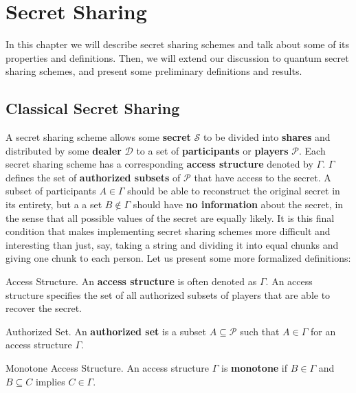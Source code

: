 \chapter{Secret Sharing}
\label{ch:ss}

In this chapter we will describe secret sharing schemes and talk about some of its properties and definitions. Then, we will extend our discussion to quantum secret sharing schemes, and present some preliminary definitions and results.

\section{Classical Secret Sharing}
\label{sec:css}

 A secret sharing scheme allows some \textbf{secret} $\mathcal{S}$ to be divided into \textbf{shares} and distributed by some \textbf{dealer} $\mathcal{D}$ to a set of \textbf{participants} or \textbf{players} $\mathcal{P}$. Each secret sharing scheme has a corresponding \textbf{access structure} denoted by $\Gamma$. $\Gamma$ defines the set of \textbf{authorized subsets} of $\mathcal{P}$ that have access to the secret. A subset of participants $A \in \Gamma$ should be able to reconstruct the original secret in its entirety, but a a set $B \notin \Gamma$ should have \textbf{no information} about the secret, in the sense that all possible values of the secret are equally likely. It is this final condition that makes implementing secret sharing schemes more difficult and interesting than just, say, taking a string and dividing it into equal chunks and giving one chunk to each person. Let us present some more formalized definitions:

\begin{definition}{Access Structure.}
    \label{defn:access-structure}
    An \textbf{access structure} is often denoted as $\Gamma$. An access structure specifies the set of all authorized subsets of players that are able to recover the secret.
\end{definition}

\begin{definition}{Authorized Set.}
    \label{defn:authorized-set}
    An \textbf{authorized set} is a subset $A \subseteq \mathcal{P}$ such that $A \in \Gamma$ for an access structure $\Gamma$.
\end{definition}

\begin{definition}{Monotone Access Structure.}
    \label{defn:monotone}
    An access structure $\Gamma$ is \textbf{monotone} if $B \in \Gamma$ and $B \subseteq C$ implies $C \in \Gamma$.
\end{definition}

